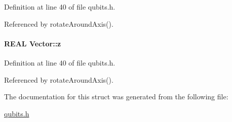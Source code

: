 Definition at line 40 of file qubits.h.

Referenced by rotateAroundAxis().\hypertarget{structVector_ad4e863651be7d6b7e2b28cd7445a0ccf}{
\paragraph[{z}]{\setlength{\rightskip}{0pt plus 5cm}REAL {\bf Vector::z}}\hfill}
\label{structVector_ad4e863651be7d6b7e2b28cd7445a0ccf}


Definition at line 40 of file qubits.h.

Referenced by rotateAroundAxis().

The documentation for this struct was generated from the following file:\begin{DoxyCompactItemize}
\item 
\hyperlink{qubits_8h}{qubits.h}\end{DoxyCompactItemize}
